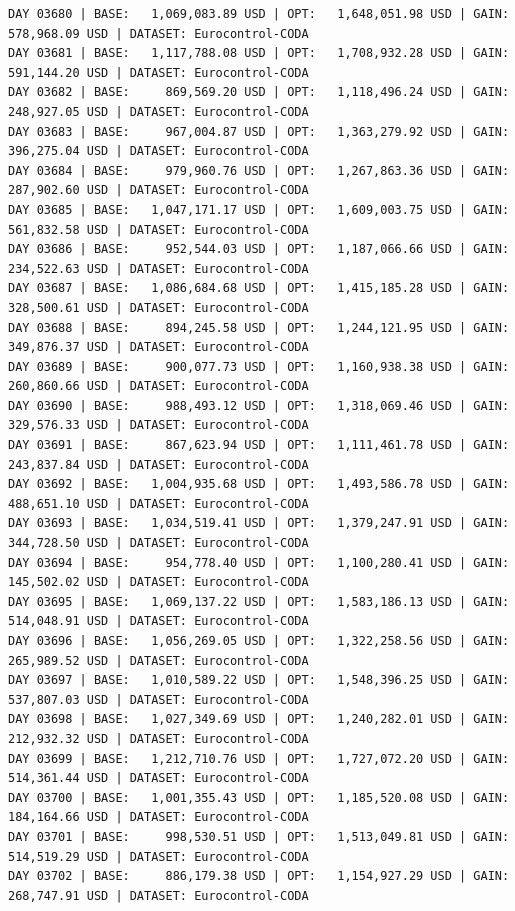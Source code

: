 \documentclass[11pt,a4paper]{article}
\begin{document}
\begin{verbatim}
DAY 03680 | BASE:   1,069,083.89 USD | OPT:   1,648,051.98 USD | GAIN: 578,968.09 USD | DATASET: Eurocontrol-CODA
DAY 03681 | BASE:   1,117,788.08 USD | OPT:   1,708,932.28 USD | GAIN: 591,144.20 USD | DATASET: Eurocontrol-CODA
DAY 03682 | BASE:     869,569.20 USD | OPT:   1,118,496.24 USD | GAIN: 248,927.05 USD | DATASET: Eurocontrol-CODA
DAY 03683 | BASE:     967,004.87 USD | OPT:   1,363,279.92 USD | GAIN: 396,275.04 USD | DATASET: Eurocontrol-CODA
DAY 03684 | BASE:     979,960.76 USD | OPT:   1,267,863.36 USD | GAIN: 287,902.60 USD | DATASET: Eurocontrol-CODA
DAY 03685 | BASE:   1,047,171.17 USD | OPT:   1,609,003.75 USD | GAIN: 561,832.58 USD | DATASET: Eurocontrol-CODA
DAY 03686 | BASE:     952,544.03 USD | OPT:   1,187,066.66 USD | GAIN: 234,522.63 USD | DATASET: Eurocontrol-CODA
DAY 03687 | BASE:   1,086,684.68 USD | OPT:   1,415,185.28 USD | GAIN: 328,500.61 USD | DATASET: Eurocontrol-CODA
DAY 03688 | BASE:     894,245.58 USD | OPT:   1,244,121.95 USD | GAIN: 349,876.37 USD | DATASET: Eurocontrol-CODA
DAY 03689 | BASE:     900,077.73 USD | OPT:   1,160,938.38 USD | GAIN: 260,860.66 USD | DATASET: Eurocontrol-CODA
DAY 03690 | BASE:     988,493.12 USD | OPT:   1,318,069.46 USD | GAIN: 329,576.33 USD | DATASET: Eurocontrol-CODA
DAY 03691 | BASE:     867,623.94 USD | OPT:   1,111,461.78 USD | GAIN: 243,837.84 USD | DATASET: Eurocontrol-CODA
DAY 03692 | BASE:   1,004,935.68 USD | OPT:   1,493,586.78 USD | GAIN: 488,651.10 USD | DATASET: Eurocontrol-CODA
DAY 03693 | BASE:   1,034,519.41 USD | OPT:   1,379,247.91 USD | GAIN: 344,728.50 USD | DATASET: Eurocontrol-CODA
DAY 03694 | BASE:     954,778.40 USD | OPT:   1,100,280.41 USD | GAIN: 145,502.02 USD | DATASET: Eurocontrol-CODA
DAY 03695 | BASE:   1,069,137.22 USD | OPT:   1,583,186.13 USD | GAIN: 514,048.91 USD | DATASET: Eurocontrol-CODA
DAY 03696 | BASE:   1,056,269.05 USD | OPT:   1,322,258.56 USD | GAIN: 265,989.52 USD | DATASET: Eurocontrol-CODA
DAY 03697 | BASE:   1,010,589.22 USD | OPT:   1,548,396.25 USD | GAIN: 537,807.03 USD | DATASET: Eurocontrol-CODA
DAY 03698 | BASE:   1,027,349.69 USD | OPT:   1,240,282.01 USD | GAIN: 212,932.32 USD | DATASET: Eurocontrol-CODA
DAY 03699 | BASE:   1,212,710.76 USD | OPT:   1,727,072.20 USD | GAIN: 514,361.44 USD | DATASET: Eurocontrol-CODA
DAY 03700 | BASE:   1,001,355.43 USD | OPT:   1,185,520.08 USD | GAIN: 184,164.66 USD | DATASET: Eurocontrol-CODA
DAY 03701 | BASE:     998,530.51 USD | OPT:   1,513,049.81 USD | GAIN: 514,519.29 USD | DATASET: Eurocontrol-CODA
DAY 03702 | BASE:     886,179.38 USD | OPT:   1,154,927.29 USD | GAIN: 268,747.91 USD | DATASET: Eurocontrol-CODA

\end{verbatim}
\end{document}
